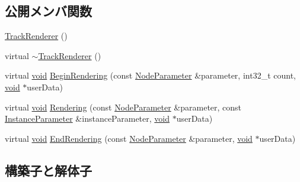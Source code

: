 \subsection*{公開メンバ関数}
\begin{DoxyCompactItemize}
\item 
\mbox{\hyperlink{class_effekseer_1_1_track_renderer_a9517f40758eac1a40a06ef05875a9acb}{Track\+Renderer}} ()
\item 
virtual \mbox{\hyperlink{class_effekseer_1_1_track_renderer_a2880354ffae0aeadffa3351968a8a99f}{$\sim$\+Track\+Renderer}} ()
\item 
virtual \mbox{\hyperlink{namespace_effekseer_ab34c4088e512200cf4c2716f168deb56}{void}} \mbox{\hyperlink{class_effekseer_1_1_track_renderer_ac252e85dddf2e8cc34b14dd00ab803b5}{Begin\+Rendering}} (const \mbox{\hyperlink{struct_effekseer_1_1_track_renderer_1_1_node_parameter}{Node\+Parameter}} \&parameter, int32\+\_\+t count, \mbox{\hyperlink{namespace_effekseer_ab34c4088e512200cf4c2716f168deb56}{void}} $\ast$user\+Data)
\item 
virtual \mbox{\hyperlink{namespace_effekseer_ab34c4088e512200cf4c2716f168deb56}{void}} \mbox{\hyperlink{class_effekseer_1_1_track_renderer_a5d99f7a58b254166cf938bc739bbb387}{Rendering}} (const \mbox{\hyperlink{struct_effekseer_1_1_track_renderer_1_1_node_parameter}{Node\+Parameter}} \&parameter, const \mbox{\hyperlink{struct_effekseer_1_1_track_renderer_1_1_instance_parameter}{Instance\+Parameter}} \&instance\+Parameter, \mbox{\hyperlink{namespace_effekseer_ab34c4088e512200cf4c2716f168deb56}{void}} $\ast$user\+Data)
\item 
virtual \mbox{\hyperlink{namespace_effekseer_ab34c4088e512200cf4c2716f168deb56}{void}} \mbox{\hyperlink{class_effekseer_1_1_track_renderer_ad8ad4cbe8cdbbaacc2106c3e689ce579}{End\+Rendering}} (const \mbox{\hyperlink{struct_effekseer_1_1_track_renderer_1_1_node_parameter}{Node\+Parameter}} \&parameter, \mbox{\hyperlink{namespace_effekseer_ab34c4088e512200cf4c2716f168deb56}{void}} $\ast$user\+Data)
\end{DoxyCompactItemize}


\subsection{構築子と解体子}
\mbox{\label{class_effekseer_1_1_track_renderer_a9517f40758eac1a40a06ef05875a9acb}} 
